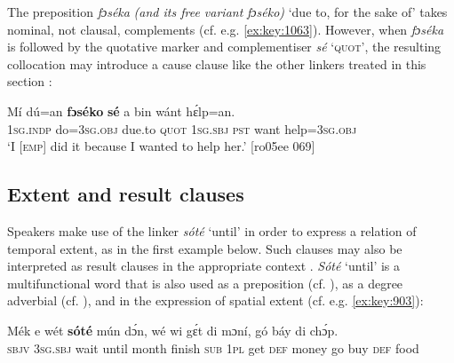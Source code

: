 \ea%
    \label{ex:key:1508}
\z\z

The preposition \textit{fɔséka} \textit{\textup{(and its free variant} }\textit{fɔséko}\textit{)} ‘due to, for the sake of’ takes nominal, not clausal, complements (cf. e.g. \ref{ex:key:1063}). However, when \textit{fɔséka} is followed by the quotative marker and complementiser \textit{sé} ‘\textsc{quot}’, the resulting collocation may introduce a cause clause like the other linkers treated in this section :


\ea%
    \label{ex:key:1509}
    \gll Mí    dú=an    \textbf{fɔséko}  \textbf{sé}    a    bin  wánt  hɛ́lp=an.\\
\textsc{1sg.indp}  do=\textsc{3sg.obj}  due.to  \textsc{quot}    \textsc{1sg.sbj}  \textsc{pst}  want  help=\textsc{3sg.obj}\\

\glt ‘I [\textsc{emp}] did it because I wanted to help her.’ [ro05ee 069]
\z

\subsection{Extent and result clauses}

Speakers make use of the linker \textit{sóté} ‘until’ in order to express a relation of temporal extent, as in the first example below. Such clauses may also be interpreted as result clauses in the appropriate context . \textit{Sóté} ‘until’ is a multifunctional word that is also used as a preposition (cf. ), as a degree adverbial (cf. ), and in the expression of spatial extent (cf. e.g. \ref{ex:key:903}):


\ea%
    \label{ex:key:1510}
    \gll Mék    e    wét    \textbf{sóté}    mún    dɔ́n,    wé  wi  gɛ́t  di  mɔní,
gó  báy  di  chɔ́p.\\
\textsc{sbjv}    \textsc{3sg.sbj}  wait    until  month  finish  \textsc{sub}  \textsc{1pl}  get  \textsc{def}  money
go  buy  \textsc{def}  food\\


